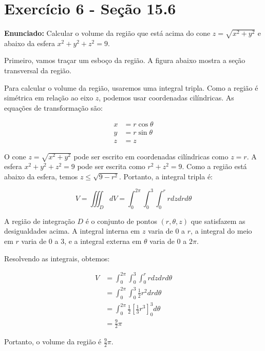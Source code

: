 \documentclass{article}
\begin{document}
\section*{Exercício 6 - Seção 15.6}
\textbf{Enunciado:} Calcular o volume da região que está acima do cone $z = \sqrt{x^2 + y^2}$ e abaixo da esfera $x^2 + y^2 + z^2 = 9$.

Primeiro, vamos traçar um esboço da região. A figura abaixo mostra a seção transversal da região. 

\begin{center}
\end{center}

Para calcular o volume da região, usaremos uma integral tripla. Como a região é simétrica em relação ao eixo $z$, podemos usar coordenadas cilíndricas. As equações de transformação são:

\begin{align*}
x &= r\cos\theta \\
y &= r\sin\theta \\
z &= z
\end{align*}

O cone $z = \sqrt{x^2 + y^2}$ pode ser escrito em coordenadas cilíndricas como $z = r$. A esfera $x^2 + y^2 + z^2 = 9$ pode ser escrita como $r^2 + z^2 = 9$. Como a região está abaixo da esfera, temos $z \leq \sqrt{9-r^2}$. Portanto, a integral tripla é:

\begin{equation*}
V = \iiint_D dV = \int_0^{2\pi} \int_0^3 \int_0^r r dz dr d\theta
\end{equation*}

A região de integração $D$ é o conjunto de pontos $(r, \theta, z)$ que satisfazem as desigualdades acima. A integral interna em $z$ varia de 0 a $r$, a integral do meio em $r$ varia de 0 a 3, e a integral externa em $\theta$ varia de 0 a $2\pi$.

Resolvendo as integrais, obtemos:

\begin{align*}
V &= \int_0^{2\pi} \int_0^3 \int_0^r r dz dr d\theta \\
&= \int_0^{2\pi} \int_0^3 \frac{1}{2}r^2 dr d\theta \\
&= \int_0^{2\pi} \frac{1}{2} \left[ \frac{1}{3}r^3 \right]_0^3 d\theta \\
&= \frac{9}{2}\pi
\end{align*}

Portanto, o volume da região é $\frac{9}{2}\pi$.
\end{document}
